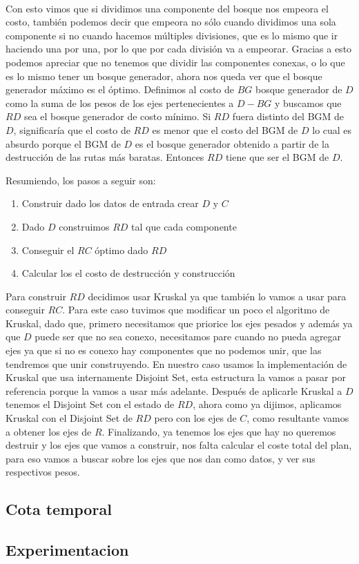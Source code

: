 \\
\par
Con esto vimos que si dividimos una componente del bosque nos empeora el costo, también podemos decir que empeora no sólo cuando dividimos una sola componente si no cuando hacemos múltiples divisiones, que es lo mismo que ir haciendo una por una, por lo que por cada división va a empeorar. Gracias a esto podemos apreciar que no tenemos que dividir las componentes conexas, o lo que es lo mismo tener un bosque generador, ahora nos queda ver que el bosque generador máximo es el óptimo. Definimos al costo de $BG$ bosque generador de $D$  como la suma de los pesos de los ejes pertenecientes a $D - BG$ y buscamos que $RD$ sea el bosque generador de costo mínimo. Si $RD$ fuera distinto del BGM de $D$, significaría que el costo de $RD$ es menor que el costo del BGM de $D$ lo cual es absurdo porque el BGM de $D$ es el bosque generador obtenido a partir de la destrucción de las rutas más baratas. Entonces $RD$ tiene que ser el BGM de $D$.
\\
\par
Resumiendo, los pasos a seguir son:
\begin{enumerate}
\item Construir dado los datos de entrada crear $D$ y $C$
\item Dado $D$ construimos $RD$ tal que cada componente
\item Conseguir el $RC$ óptimo dado $RD$
\item Calcular los el costo de destrucción y construcción
\end{enumerate}
Para construir $RD$ decidimos usar Kruskal ya que también lo vamos a usar para conseguir $RC$. Para este caso tuvimos que modificar un poco el algoritmo de Kruskal, dado que, primero necesitamos que priorice los ejes pesados y además ya que $D$ puede ser que no sea conexo, necesitamos pare cuando no pueda agregar ejes ya que si no es conexo hay componentes que no podemos unir, que las tendremos que unir construyendo. En nuestro caso usamos la implementación de Kruskal que usa internamente Disjoint Set, esta estructura la vamos a pasar por referencia porque la vamos a usar más adelante.
Después de aplicarle Kruskal a $D$ tenemos el Disjoint Set con el estado de $RD$, ahora como ya dijimos, aplicamos Kruskal con el Disjoint Set de $RD$ pero con los ejes de $C$, como resultante vamos a obtener los ejes de $R$. Finalizando, ya tenemos los ejes que hay no queremos destruir y los ejes que vamos a construir, nos falta calcular el coste total del plan, para eso vamos a buscar sobre los ejes que nos dan como datos, y ver sus respectivos pesos.


\subsection{Cota temporal}

\subsection{Experimentacion}

\pagebreak